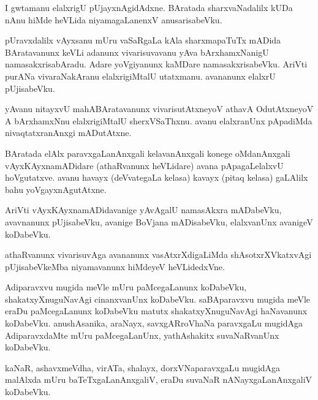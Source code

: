 \documentclass{article}
\begin{document}
\begin{mn}
I  gwtamanu  elalxrigU  pUjayxnAgidAdxne.  BAratada  sharxvaNadalilx  kUDa  nAnu  hiMde  heVLida  
niyamagaLanenxV  anusarisabeVku.
\end{mn}

\begin{mn}
pUravxdalilx  vAyxsanu  mUru  vaSaRgaLa  kAla  sharxmapaTuTx  mADida  BAratavanunx  keVLi  adanunx  
vivarisuvavanu  yAva  bArxhamxNanigU  namasakxrisabAradu.  Adare  yoVgiyanunx  kaMDare  namasakxrisabeVku.  
AriVti  purANa  vivaraNakAranu  elalxrigiMtalU  utatxmanu.  avananunx  elalxrU  pUjisabeVku.
\end{mn}

\begin{mn}
yAvanu  nitayxvU  mahABAratavanunx  vivarisutAtxneyoV  athavA  OdutAtxneyoV  A  bArxhamxNnu  elalxrigiMtalU  
sherxVSaThxnu. avanu  elalxranUnx  pApadiMda  nivaqtatxranAnxgi  mADutAtxne.
\end{mn}

\begin{mn}
BAratada  elAlx  paravxgaLanAnxgali  kelavanAnxgali  konege  oMdanAnxgali  vAyxKAyxnamADidare 
(athaRvanunx  heVLidare) avana  pApagaLelalxvU  hoVgutatxve.  avanu  havayx (deVvategaLa  kelasa) 
kavayx (pitaq kelasa) gaLAlilx  bahu  yoVgayxnAgutAtxne.
\end{mn}

\begin{mn}
AriVti  vAyxKAyxnamADidavanige  yAvAgalU  namasAkxra  mADabeVku,  avavnanunx  pUjisabeVku,  avanige  
BoVjana  mADisabeVku,  elalxvanUnx  avanigeV  koDabeVku.
\end{mn}

\begin{mn}
athaRvanunx  vivarisuvAga  avananunx  vasAtxrXdigaLiMda  shAsotxrXVkatxvAgi  pUjisabeVkeMba  
niyamavanunx  hiMdeyeV  heVLidedxVne.
\end{mn}

\begin{mn}
Adiparavxvu  mugida  meVle  mUru  paMcegaLanunx  koDabeVku,  shakatxyXnuguNavAgi  cinanxvanUnx  
koDabeVku.  saBAparavxvu  mugida  meVle    eraDu  paMcegaLanunx  koDabeVku  matutx  shakatxyXnuguNavAgi  
haNavanunx  koDabeVku.  anushAsanika,  araNayx,  savxgARroVhaNa  paravxgaLu  mugidAga  AdiparavxdaMte  
mUru  paMcegaLanUnx,  yathAshakitx  suvaNaRvanUnx  koDabeVku.
\end{mn}

\begin{mn}
kaNaR,  ashavxmeVdha,  virATa,  shalayx,  dorxVNaparavxgaLu  mugidAga  malAlxda  mUru  baTeTxgaLanAnxgaliV,  
eraDu  suvaNaR  nANayxgaLanAnxgaliV  koDabeVku.
\end{mn}
\end{document}
